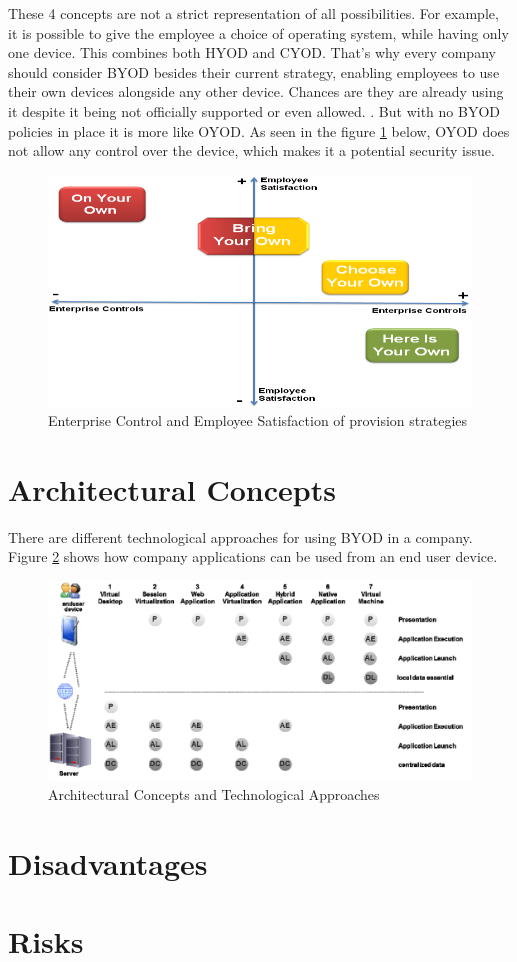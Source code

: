 These 4 concepts are not a strict representation of all possibilities. For example, it is possible to give the employee a choice of operating system, while having only one device. This combines both HYOD and CYOD. That's why every company should consider BYOD besides their current strategy, enabling employees to use their own devices alongside any other device. Chances are they are already using it despite it being not officially supported or even allowed. \parencite{IBMSecurity.2016}. But with no BYOD policies in place it is more like OYOD. As seen in the figure \ref{fig:control_v_satisfaction} below, OYOD does not allow any control over the device, which makes it a potential security issue.
\begin{figure}[H]
\includegraphics[width=0.7\linewidth]{images/control_v_satisfaction}
\caption{Enterprise Control and Employee Satisfaction of provision strategies \parencite{KumarGajar.2013}}
\label{fig:control_v_satisfaction}
\end{figure}

\section{Architectural Concepts}
There are different technological approaches for using BYOD in a company. Figure \ref{fig:architectural_concepts} shows how company applications can be used from an end user device.  \parencite{Disterer.2013}
\begin{figure}[H]
	\includegraphics[width=1\linewidth]{images/architectural_concepts}
	\caption{Architectural Concepts and Technological Approaches \parencite{Disterer.2013}}
	\label{fig:architectural_concepts}
\end{figure}

\section{Disadvantages}

\section{Risks}
